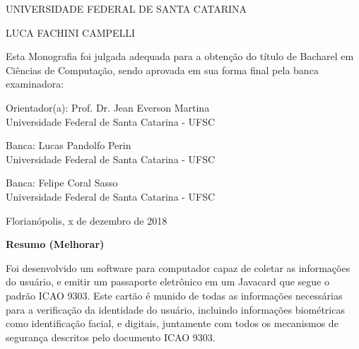\documentclass[11pt]{article}
\begin{document}
	\begin{center}


        {UNIVERSIDADE FEDERAL DE SANTA CATARINA}

        \vspace{1.5cm}
        {LUCA FACHINI CAMPELLI}
                                    
        \vspace{0.8cm}
        Esta Monografia foi julgada adequada para a obten\c{c}\~{a}o do título  de Bacharel em Ciências de Computação, sendo aprovada em sua forma final  pela banca examinadora:

         \vspace{2.5cm}
         \textbf{\underline{\hspace{8cm}}}
         
        {Orientador(a): Prof. Dr. Jean Everson Martina \\ Universidade Federal de Santa Catarina - UFSC}
    
        \vspace{2cm}
    
        \textbf{\underline{\hspace{8cm}}}
         
        {Banca: Lucas Pandolfo Perin \\ Universidade Federal de Santa Catarina - UFSC}
        
        \vspace{2cm}
    
        \textbf{\underline{\hspace{8cm}}}
         
        {Banca: Felipe Coral Sasso \\ Universidade Federal de Santa Catarina - UFSC}
    
        \vfill
         
        Florianópolis, x de dezembro de 2018
    
        
    
    \end{center}
  
	
	\newpage

	\large \textbf{Resumo (Melhorar)}
	
		\hspace{1em}
		
    	Foi desenvolvido um software para computador capaz de coletar as informações do usuário, e emitir um passaporte eletrônico em um Javacard que segue o padrão ICAO 9303. Este cartão é munido de todas as informações necessárias para a verificação da identidade do usuário, incluindo informações biométricas como identificação facial, e digitais, juntamente com todos os mecanismos de segurança descritos pelo documento ICAO 9303.
	
\end{document}
